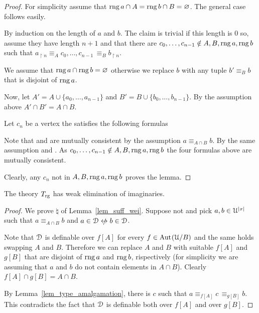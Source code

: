 \begin{proof}
  For simplicity assume that $\mathop{\rm rng} a\cap A=\mathop{\rm rng} b\cap B=\varnothing$.
  The general case follows easily.

  By induction on the length of $a$ and $b$. 
  The claim is trivial if this length is $0$ so, assume they have length $n+1$ and that there are $c_0,\dots,c_{n-1}\notin A, B,\mathop{\rm rng} a,\mathop{\rm rng} b$ such that $a_{\restriction n}\equiv_A c_0,\dots,c_{n-1}\,\equiv_B b_{\restriction n}$.

  We assume that $\mathop{\rm rng} a\cap\mathop{\rm rng} b=\varnothing$ otherwise we replace $b$ with any tuple $b'\equiv_Bb$ that is disjoint of $\mathop{\rm rng} a$.

  Now, let $A'=A\cup\{a_0,\dots,a_{n-1}\}$ and $B'=B\cup\{b_0,\dots,b_{n-1}\}$.
  By the assumption above $A'\cap B'=A\cap B$.

  Let $c_n$ be a vertex the satisfies the following formulas





  Note that  and  are mutually consistent by the assumption $a\equiv_{A\cap B}b$.
  By the same assumption  and .
  As $c_0,\dots,c_{n-1}\notin A, B,\mathop{\rm rng} a,\mathop{\rm rng} b$ the four formulas above are mutually consistent.

  Clearly, any $c_n$ not in $A, B,\mathop{\rm rng} a,\mathop{\rm rng} b$ proves the lemma.
\end{proof}


\begin{lemma}
  The theory $T_{\rm rg}$ has weak elimination of imaginaries.
\end{lemma}

\begin{proof}
  We prove ${\natural}$ of Lemma~\ref{lem_suff_wei}.
  Suppose not and pick $a,b\in\EuScript U^{|x|}$ such that $a\equiv_{A\cap B}b$ and $a\in\D\niff b\in\D$.

  Note that $\EuScript D$ is definable over $f[A]$ for every $f\in{\rm Aut\kern.15ex}(\EuScript U/B)$ and the same holds swapping $A$ and $B$.
  Therefore we can replace $A$ and $B$ with suitable $f[A]$ and $g[B]$ that are disjoint of $\mathop{\rm rng} a$ and $\mathop{\rm rng} b$, rispectively (for simplicity we are assuming that $a$ and $b$ do not contain elements in $A\cap B$).
  Clearly $f[A]\cap g[B]=A\cap B$.

  By Lemma~\ref{lem_type_amalgamation}, there is $c$ such that $a\equiv_{f[A]} c\,\equiv_{g[B]} b$.
  This contradicts the fact that $\EuScript D$ is definable both over $f[A]$ and over $g[B]$.
\end{proof}


